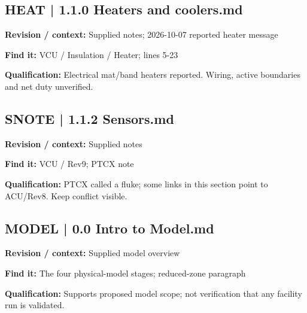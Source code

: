 \documentclass[11pt]{article}
\begin{document}
\par\noindent\begin{minipage}{\textwidth}\small
\subsection*{HEAT | 1.1.0 Heaters and coolers.md}
\textbf{Revision / context:} Supplied notes; 2026-10-07 reported heater message\par
\textbf{Find it:} VCU / Insulation / Heater; lines 5-23\par
\textbf{Qualification:} Electrical mat/band heaters reported. Wiring, active boundaries and net duty unverified.\par
\end{minipage}\par\vspace{5pt}
\par
\par\noindent\begin{minipage}{\textwidth}\small
\subsection*{SNOTE | 1.1.2 Sensors.md}
\textbf{Revision / context:} Supplied notes\par
\textbf{Find it:} VCU / Rev9; PTCX note\par
\textbf{Qualification:} PTCX called a fluke; some links in this section point to ACU/Rev8. Keep conflict visible.\par
\end{minipage}\par\vspace{5pt}
\par\noindent\begin{minipage}{\textwidth}\small
\subsection*{MODEL | 0.0 Intro to Model.md}
\textbf{Revision / context:} Supplied model overview\par
\textbf{Find it:} The four physical-model stages; reduced-zone paragraph\par
\textbf{Qualification:} Supports proposed model scope; not verification that any facility run is validated.\par
\end{minipage}\par\vspace{5pt}
\end{document}
